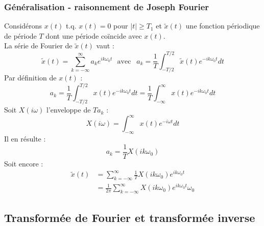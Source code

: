 		\subsubsection{Généralisation - raisonnement de Joseph Fourier}
		Considérons $x(t)$ t.q. $x(t) =0$ pour $|t|\geq T_1$ et $\tilde{
		x}(t)$ une fonction périodique de période $T$ dont une période 
		coïncide avec $x(t)$.\\
		La série de Fourier de $\tilde{x}(t)$ vaut : 
		\begin{equation}
		\tilde{x}(t) = \sum_{k=-\infty}^\infty a_ke^{ik\omega_0t}\ \ \
		\text{avec }\ \ a_k = \frac{1}{T}\int_{-T/2}^{T/2} \tilde{x}(t)
		e^{-ik\omega_0t}dt
		\end{equation}
		Par définition de $x(t)$ :
		\begin{equation}
		a_k  = \frac{1}{T}\int_{-T/2}^{T/2} x(t)e^{-ik\omega_0t}dt = \frac{1}
		{T}\int_{-\infty}^\infty x(t)e^{-ik\omega_0t}dt
		\end{equation}
		Soit $X(i\omega)$ l'enveloppe de $Ta_k$ :
		\begin{equation}
		X(i\omega) = \int_{-\infty}^\infty x(t)e^{-i\omega t}dt
		\end{equation}
		Il en résulte :
		\begin{equation}
		a_k = \frac{1}{T}X(ik\omega_0)
		\end{equation}
		Soit encore : 
		\begin{equation}
		\begin{array}{ll}
		\tilde{x}(t) &= \sum_{k=-\infty}^\infty \frac{1}{T}X(ik\omega_0)e^
		{ik\omega_0t}\\
		&= \frac{1}{2\pi}\sum_{k=-\infty}^\infty X(ik\omega_0)e^{ik
		\omega_0t}\omega_0
		\end{array}
		\label{eq:ObtFourier}
		\end{equation}
		
		
	\subsection{Transformée de Fourier et transformée inverse}
	\ \\
	


